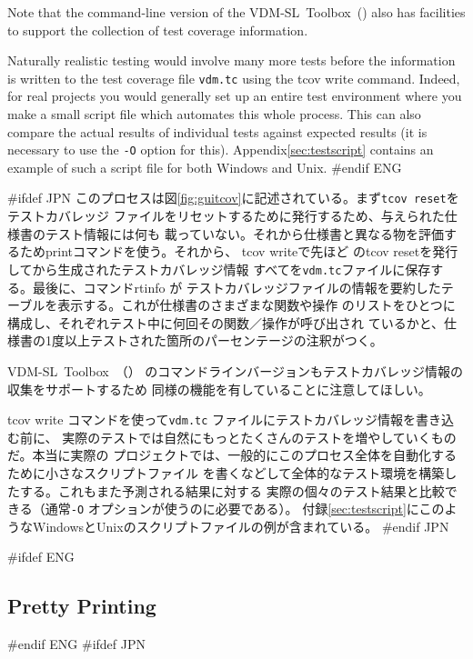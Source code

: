 \documentclass[\pformat,12pt]{article}
\newcommand{\vdmslpp}{VDM-SL}
\newcommand{\Toolbox}{Toolbox}
\newcommand{\vdmslpp}{VDM++}
\newcommand{\Toolbox}{Toolbox}
\newcommand{\guicmd}[1]{{\sf #1}}
\newcommand{\guicmd}[1]{{\gt #1}}
\begin{document}
Note that the command-line version of the \vdmslpp\ \Toolbox\ 
() also
has facilities to support the collection of test coverage
information.

Naturally realistic testing would involve many more tests before the
information is written to the test coverage file \texttt{vdm.tc} using the
\guicmd{tcov write} command. Indeed, for
real projects you would generally set up an entire test environment 
where you make a small script file which automates this whole
process. This can also compare the actual results of individual tests
against expected results (it is necessary to use the {\tt -O} option
for this).  Appendix\ref{sec:testscript} contains an example of such
a script file for both Windows and Unix.
#endif ENG

#ifdef JPN
このプロセスは図\ref{fig:guitcov}に記述されている。まず{\tt tcov reset}をテストカバレッジ
ファイルをリセットするために発行するため、与えられた仕様書のテスト情報には何も
載っていない。それから仕様書と異なる物を評価するため\guicmd{print}コマンドを使う。それから、
\guicmd{tcov write}で先ほど
の\guicmd{tcov reset}を発行してから生成されたテストカバレッジ情報
すべてを\texttt{vdm.tc}ファイルに保存する。最後に、コマンド\guicmd{rtinfo} が
テストカバレッジファイルの情報を要約したテーブルを表示する。これが仕様書のさまざまな関数や操作
のリストをひとつに構成し、それぞれテスト中に何回その関数／操作が呼び出され
ているかと、仕様書の1度以上テストされた箇所のパーセンテージの注釈がつく。

\vdmslpp\ \Toolbox\ （）
のコマンドラインバージョンもテストカバレッジ情報の収集をサポートするため
同様の機能を有していることに注意してほしい。

\guicmd{tcov write} コマンドを使って\texttt{vdm.tc} ファイルにテストカバレッジ情報を書き込む前に、
実際のテストでは自然にもっとたくさんのテストを増やしていくものだ。本当に実際の
プロジェクトでは、一般的にこのプロセス全体を自動化するために小さなスクリプトファイル
を書くなどして全体的なテスト環境を構築したする。これもまた予測される結果に対する
実際の個々のテスト結果と比較できる（通常{\tt -O} オプションが使うのに必要である）。
付録\ref{sec:testscript}にこのようなWindowsとUnixのスクリプトファイルの例が含まれている。
#endif JPN

#ifdef ENG
\subsection{Pretty Printing}\label{subsec:pp}
#endif ENG
#ifdef JPN
\end{document}
